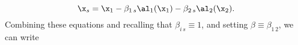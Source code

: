 \begin{equation}
\x_s = \x_1 - \beta_{1\,s} \al_1(\x_1) - \beta_{2\,s} \al_2(\x_2).
\end{equation}
Combining these equations and recalling that $\beta_{i\,s} \equiv 1$, and setting $\beta \equiv \beta_{1\,2}$, we can write